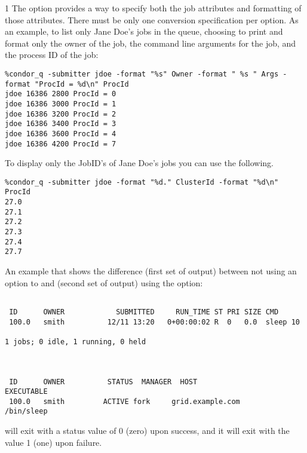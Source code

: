 \begin{ManPage}{\label{man-condor-q}}{1}
The  option provides a way to specify both the job attributes
and formatting of those attributes.
There must be only one conversion specification per  option.
As an example, to list only Jane Doe's jobs in the queue,
choosing to print and format only the owner of the job,
the command line arguments for the job, and the
process ID of the job:
\footnotesize
\begin{verbatim}
%condor_q -submitter jdoe -format "%s" Owner -format " %s " Args -format "ProcId = %d\n" ProcId
jdoe 16386 2800 ProcId = 0
jdoe 16386 3000 ProcId = 1
jdoe 16386 3200 ProcId = 2
jdoe 16386 3400 ProcId = 3
jdoe 16386 3600 ProcId = 4
jdoe 16386 4200 ProcId = 7
\end{verbatim}
\normalsize

To display only the JobID's of Jane Doe's jobs you can use the following.
\footnotesize
\begin{verbatim}
%condor_q -submitter jdoe -format "%d." ClusterId -format "%d\n" ProcId
27.0
27.1
27.2
27.3
27.4
27.7
\end{verbatim}
\normalsize

An example that shows the difference (first set of output)
between not using an option to  and (second
set of output) using the  option:
\footnotesize
\begin{verbatim}

 ID      OWNER            SUBMITTED     RUN_TIME ST PRI SIZE CMD
 100.0   smith          12/11 13:20   0+00:00:02 R  0   0.0  sleep 10

1 jobs; 0 idle, 1 running, 0 held



 ID      OWNER          STATUS  MANAGER  HOST                EXECUTABLE
 100.0   smith         ACTIVE fork     grid.example.com       /bin/sleep
\end{verbatim}
\normalsize

\ExitStatus

 will exit with a status value of 0 (zero) upon success,
and it will exit with the value 1 (one) upon failure.

\end{ManPage}

